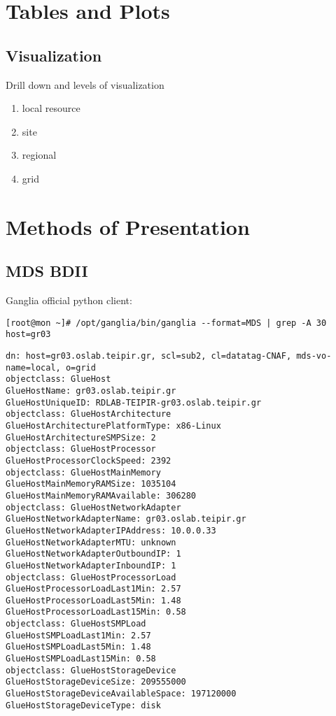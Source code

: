 \section{Tables and Plots}
\subsection{Visualization}
Drill down and levels of visualization
\begin{enumerate}
  \item local resource
  \item site
  \item regional
  \item grid
\end{enumerate}
\section{Methods of Presentation}
\subsection{MDS BDII}
Ganglia official python client:
\begin{verbatim}
[root@mon ~]# /opt/ganglia/bin/ganglia --format=MDS | grep -A 30 host=gr03
\end{verbatim}

\begin{lstlisting}
dn: host=gr03.oslab.teipir.gr, scl=sub2, cl=datatag-CNAF, mds-vo-name=local, o=grid
objectclass: GlueHost
GlueHostName: gr03.oslab.teipir.gr
GlueHostUniqueID: RDLAB-TEIPIR-gr03.oslab.teipir.gr
objectclass: GlueHostArchitecture
GlueHostArchitecturePlatformType: x86-Linux
GlueHostArchitectureSMPSize: 2
objectclass: GlueHostProcessor
GlueHostProcessorClockSpeed: 2392
objectclass: GlueHostMainMemory
GlueHostMainMemoryRAMSize: 1035104
GlueHostMainMemoryRAMAvailable: 306280
objectclass: GlueHostNetworkAdapter
GlueHostNetworkAdapterName: gr03.oslab.teipir.gr
GlueHostNetworkAdapterIPAddress: 10.0.0.33
GlueHostNetworkAdapterMTU: unknown
GlueHostNetworkAdapterOutboundIP: 1
GlueHostNetworkAdapterInboundIP: 1
objectclass: GlueHostProcessorLoad
GlueHostProcessorLoadLast1Min: 2.57
GlueHostProcessorLoadLast5Min: 1.48
GlueHostProcessorLoadLast15Min: 0.58
objectclass: GlueHostSMPLoad
GlueHostSMPLoadLast1Min: 2.57
GlueHostSMPLoadLast5Min: 1.48
GlueHostSMPLoadLast15Min: 0.58
objectclass: GlueHostStorageDevice
GlueHostStorageDeviceSize: 209555000
GlueHostStorageDeviceAvailableSpace: 197120000
GlueHostStorageDeviceType: disk
\end{lstlisting}

